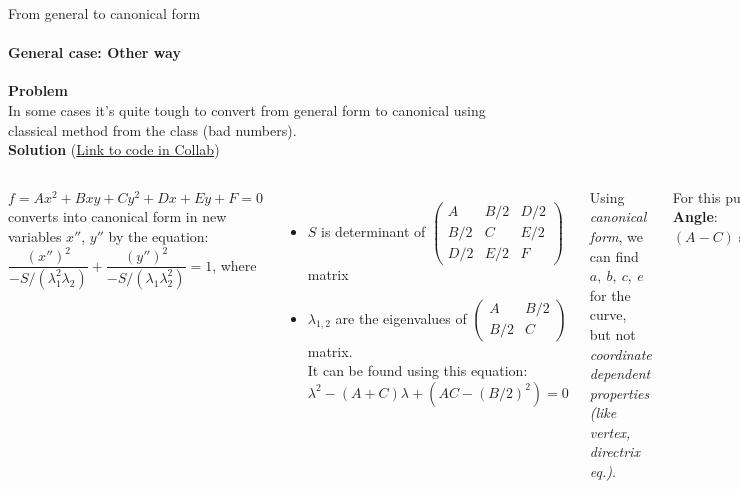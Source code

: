 \documentclass[aspectratio=169]{beamer}
\begin{document}
\begin{frame}[t]{From general to canonical form}
\framesubtitle{General case: Other way}
\scriptsize
\vspace{-0.3cm}
\textbf{Problem}\\
In some cases it's quite tough to convert from general form to canonical using classical method from the class (bad numbers).\\
\textbf{Solution} (\href{https://colab.research.google.com/drive/1onK5b0n44GPuDY2NHEWbcl5ZuBcLu5z2?usp=sharing}{Link to code in Collab}) \smallskip
\begin{columns}[onlytextwidth]
$f = Ax^{2}+Bxy+Cy^{2}+Dx+Ey+F=0$ \\
converts into canonical form in new variables ${x''}$, ${y''}$ by the equation:
$
    {\dfrac {{({x}'')}^{2}}{-S/(\lambda _{1}^{2}\lambda _{2})}}+{\dfrac {{({y}'')}^{2}}{-S/(\lambda _{1}\lambda _{2}^{2})}}=1
$, where \\
\begin{itemize}
    \item $S$ is determinant of $\left({\begin{matrix}A&B/2&D/2\\B/2&C&E/2\\D/2&E/2&F\end{matrix}}\right)$ matrix 
\item $\lambda_{1,2}$ are the eigenvalues of  $\left({\begin{matrix}A&B/2\\B/2&C\end{matrix}}\right)$ matrix.\\
It can be found using this equation:
$
    \lambda ^{2}-(A+C)\lambda +(AC-(B/2)^{2})=0
$
\end{itemize}
Using \textit{canonical form}, we can find $a,\ b,\ c,\ e$ for the curve, but not \textit{coordinate dependent properties (like vertex, directrix eq.)}.

For this purpose, we need to find \textbf{angle} and \textbf{shift}.\\
\textbf{Angle}: $(A-C)\sin(2\alpha) + B\cos(2\alpha) = 0; \rightarrow \alpha = ...$

\textbf{Shift (center of the curve)}
\begin{equation*}
    \left\{\begin{matrix*}[l] \frac{\partial f}{\partial x}\\ \frac{\partial f}{\partial y} \end{matrix*}\right. \rightarrow \text{2 equations of line} \rightarrow \text{solve system } (x_c;y_c)
\end{equation*}


\end{columns}
\end{frame}
\end{document}
